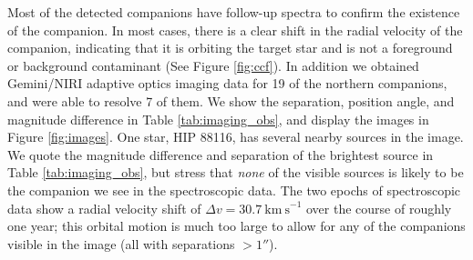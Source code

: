 \documentclass{emulateapj}
\begin{document}
Most of the detected companions have follow-up spectra to confirm the existence of the companion. In most cases, there is a clear shift in the radial velocity of the companion, indicating that it is orbiting the target star and is not a foreground or background contaminant (See Figure \ref{fig:ccf}). In addition we obtained Gemini/NIRI adaptive optics imaging data for 19 of the northern companions, and were able to resolve 7 of them. We show the separation, position angle, and magnitude difference in Table \ref{tab:imaging_obs}, and display the images in Figure \ref{fig:images}. One star, HIP 88116, has several nearby sources in the image. We quote the magnitude difference and separation of the brightest source in Table \ref{tab:imaging_obs}, but stress that \emph{none} of the visible sources is likely to be the companion we see in the spectroscopic data. The two epochs of spectroscopic data show a radial velocity shift of $\Delta v = 30.7\ \mathrm{km\ s}^{-1}$ over the course of roughly one year; this orbital motion is much too large to allow for any of the companions visible in the image (all with separations $ > 1''$).
\end{document}

